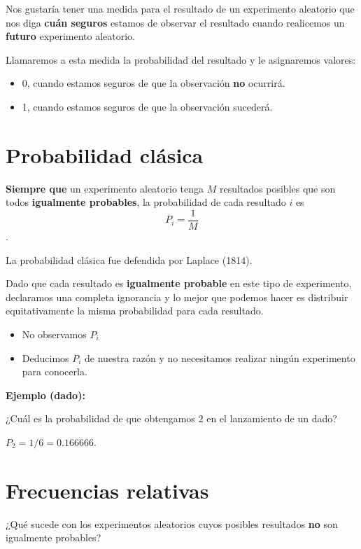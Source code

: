 \documentclass[
]{book}
\providecommand{\tightlist}{%
  \setlength{\itemsep}{0pt}\setlength{\parskip}{0pt}}
\begin{document}
Nos gustaría tener una medida para el resultado de un experimento aleatorio que nos diga \textbf{cuán seguros} estamos de observar el resultado cuando realicemos un \textbf{futuro} experimento aleatorio.

Llamaremos a esta medida la probabilidad del resultado y le asignaremos valores:

\begin{itemize}
\item
  0, cuando estamos seguros de que la observación \textbf{no} ocurrirá.
\item
  1, cuando estamos seguros de que la observación sucederá.
\end{itemize}

\hypertarget{probabilidad-cluxe1sica}{%
\section{Probabilidad clásica}\label{probabilidad-cluxe1sica}}

\textbf{Siempre que} un experimento aleatorio tenga \(M\) resultados posibles que son todos \textbf{igualmente probables}, la probabilidad de cada resultado \(i\) es \[P_i=\frac{1}{M}\].

La probabilidad clásica fue defendida por Laplace (1814).

Dado que cada resultado es \textbf{igualmente probable} en este tipo de experimento, declaramos una completa ignorancia y lo mejor que podemos hacer es distribuir equitativamente la misma probabilidad para cada resultado.

\begin{itemize}
\tightlist
\item
  No observamos \(P_i\)
\item
  Deducimos \(P_i\) de nuestra razón y no necesitamos realizar ningún experimento para conocerla.
\end{itemize}

\textbf{Ejemplo (dado):}

¿Cuál es la probabilidad de que obtengamos \(2\) en el lanzamiento de un dado?

\(P_2=1/6=0.166666\).

\hypertarget{frecuencias-relativas-1}{%
\section{Frecuencias relativas}\label{frecuencias-relativas-1}}

¿Qué sucede con los experimentos aleatorios cuyos posibles resultados \textbf{no} son igualmente probables?
\end{document}
